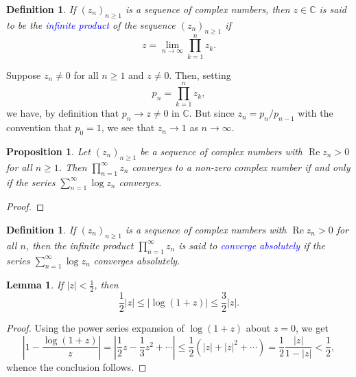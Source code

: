 \documentclass[11pt]{article}
\theoremstyle{thmstyle}
\newtheorem{lemma}[theorem]{Lemma}
\newtheorem{proposition}[theorem]{Proposition}
\theoremstyle{defstyle}
\newtheorem{definition}[theorem]{Definition}
\newcommand{\bbC}{\mathbb{C}}
\newcommand{\define}[1]{\textcolor{blue}{\textit{#1}}}
\renewcommand{\le}{\leqslant}
\renewcommand{\ge}{\geqslant}
\renewcommand{\Re}{\operatorname{Re}}
\begin{document}
\begin{definition}
    If $(z_n)_{n\ge 1}$ is a sequence of complex numbers, then $z\in\bbC$ is said to be the \define{infinite product} of the sequence $(z_n)_{n\ge 1}$ if 
    \begin{equation*}
        z = \lim_{n\to\infty}\prod_{k = 1}^n z_k.
    \end{equation*}
\end{definition}

Suppose $z_n\ne 0$ for all $n\ge 1$ and $z\ne 0$. Then, setting 
\begin{equation*}
    p_n = \prod_{k = 1}^n z_k,
\end{equation*}
we have, by definition that $p_n\to z\ne 0$ in $\bbC$. But since $z_n = p_n/p_{n - 1}$ with the convention that $p_0 = 1$, we see that $z_n\to 1$ as $n\to\infty$.

\begin{proposition}
    Let $(z_n)_{n\ge 1}$ be a sequence of complex numbers with $\Re z_n > 0$ for all $n\ge 1$. Then $\displaystyle\prod_{n = 1}^\infty z_n$ converges to a \emph{non-zero} complex number if and only if the series $\displaystyle\sum_{n = 1}^\infty\log z_n$ converges.
\end{proposition}
\begin{proof}
\end{proof}

\begin{definition}
    If $(z_n)_{n\ge 1}$ is a sequence of complex numbers with $\Re z_n > 0$ for all $n$, then the infinite product $\displaystyle\prod_{n = 1}^\infty z_n$ is said to \define{converge absolutely} if the series $\displaystyle\sum_{n = 1}^\infty\log z_n$ converges absolutely.
\end{definition}

\begin{lemma}
    If $|z| < \frac{1}{2}$, then 
    \begin{equation*}
        \frac{1}{2}|z|\le |\log (1 + z)|\le\frac{3}{2}|z|.
    \end{equation*}
\end{lemma}
\begin{proof}
    Using the power series expansion of $\log(1 + z)$ about $z = 0$, we get 
    \begin{equation*}
        \left|1 - \frac{\log(1 + z)}{z}\right| = \left|\frac{1}{2}z - \frac{1}{3}z^2 + \cdots\right|\le\frac{1}{2}\left(|z| + |z|^2 + \cdots\right) = \frac{1}{2}\frac{|z|}{1 - |z|} < \frac{1}{2},
    \end{equation*}
    whence the conclusion follows.
\end{proof}
\end{document}
